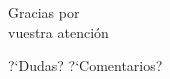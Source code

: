 \documentclass[compress]{beamer}
\begin{document}

\section*{}
\begin{frame}[plain]
	\addtocounter{framenumber}{-1}

	\begin{center}
		{\Huge{Gracias por\\vuestra atenci\'on}}
	\end{center}
	\begin{center}
		{\large{?`Dudas? ?`Comentarios?}}
	\end{center}
\end{frame}

\end{document}
